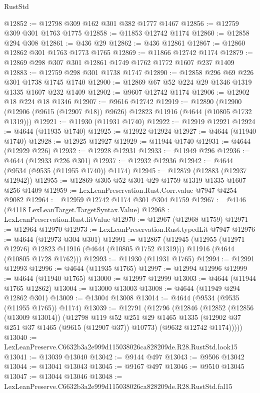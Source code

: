 \begin{lexlean}{RustStd}
\begin{coremodule}
@12852 := @12798 @309 @162 @301 @382 @1777 @1467
@12856 := @12759 @309 @301 @1763 @1775
@12858 := @11853 @12742 @1174
@12860 := @12858 @294 @308
@12861 := @436 @29
@12862 := @436 @12861
@12867 := @12860 @12862 @301 @1763 @1773 @1765
@12869 := @11866 @12742 @1174
@12879 := @12869 @298 @307 @301 @12861 @1749 @1762 @1772 @1607 @237 @1409
@12883 := @12759 @298 @301 @1738 @1747
@12890 := @12858 @296 @69 @226 @301 @1738 @1745 @1740
@12900 := @12869 @67 @52 @224 @29 @1346 @1319 @1335 @1607 @232 @1409
@12902 := @9607 @12742 @1174
@12906 := @12902 @18 @224 @18 @1346
@12907 := @9616 @12742
@12919 := @12890
    (@12900 (@12906 (@9615 (@12907 @18)) @9626) @12823 @11916 (@4644 (@10805 @1732 @1319)))
@12921 := @11930 (@11931 @1740)
@12922 := @12919 @12921
@12924 := @4644 (@11935 @1740)
@12925 := @12922 @12924
@12927 := @4644 (@11940 @1740)
@12928 := @12925 @12927
@12929 := @11944 @1740
@12931 := @4644 (@12929 @226)
@12932 := @12928 @12931
@12933 := @11949 @296
@12936 := @4644 (@12933 @226 @301)
@12937 := @12932 @12936
@12942 := @4644 (@9534 (@9535 (@11955 @1740)) @1174)
@12945 := @12879 (@12883 (@12937 @12942))
@12955 := @12869 @305 @52 @301 @29 @1759 @1319 @1335 @1607 @256 @1409
@12959 := LexLeanPreservation.Rust.Corr.value @7947 @4254 @9082
@12964 := @12959 @12742 @1174 @301 @304 @1759
@12967 := @4146 (@4118 LexLeanTarget.TargetSyntax.Value)
@12968 := LexLeanPreservation.Rust.litValue
@12970 := @12967 (@12968 @1759)
@12971 := @12964 @12970
@12973 := LexLeanPreservation.Rust.typedLit @7947
@12976 := @4644 (@12973 @304 @301)
@12991 := @12867
    (@12945
      (@12955 (@12971 @12976) @12823 @11916 (@4644 (@10805 @1752 @1319)))
      @11916
      (@4644 (@10805 @1728 @1762)))
@12993 := @11930 (@11931 @1765)
@12994 := @12991 @12993
@12996 := @4644 (@11935 @1765)
@12997 := @12994 @12996
@12999 := @4644 (@11940 @1765)
@13000 := @12997 @12999
@13003 := @4644 (@11944 @1765 @12862)
@13004 := @13000 @13003
@13008 := @4644 (@11949 @294 @12862 @301)
@13009 := @13004 @13008
@13014 := @4644 (@9534 (@9535 (@11955 @1765)) @1174)
@13039 := @12791
    (@12796
      (@12846
        (@12852
          (@12856 (@13009 @13014))
          (@12798
            @119
            @52
            @251
            @29
            @1465
            @1335
            (@12902 @37 @251 @37 @1465 (@9615 (@12907 @37)) @10773)
            (@9632 @12742 @1174)))))
@13040 := LexLeanPreserve.C6632b3a2e999d115038026ca828209de.R28.RustStd.look15
@13041 := @13039 @13040
@13042 := @9144 @497
@13043 := @9506 @13042
@13044 := @13041 @13043
@13045 := @9167 @497
@13046 := @9510 @13045
@13047 := @13044 @13046
@13048 := LexLeanPreserve.C6632b3a2e999d115038026ca828209de.R28.RustStd.fal15

\end{coremodule}
\end{lexlean}
